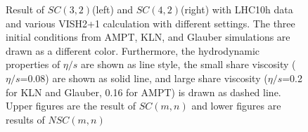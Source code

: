 \begin{figure}[!p]
\begin{center}
        \caption{Result of  $SC(3,2)$(left) and $SC(4,2)$(right) with LHC10h data and various VISH2+1 calculation with different settings. The three initial conditions from AMPT, KLN, and Glauber simulations are drawn as a different color. Furthermore, the hydrodynamic properties of $\eta/s$ are shown as line style, the small share viscosity ($\eta/s$=0.08) are shown as solid line, and large share viscosity ($\eta/s$=0.2 for KLN and Glauber, 0.16 for AMPT) is drawn as dashed line. Upper figures are the result of $SC(m,n)$ and lower figures are results of  $NSC(m,n)$}
        \label{vish21}
        \end{center}   
     \end{figure}


